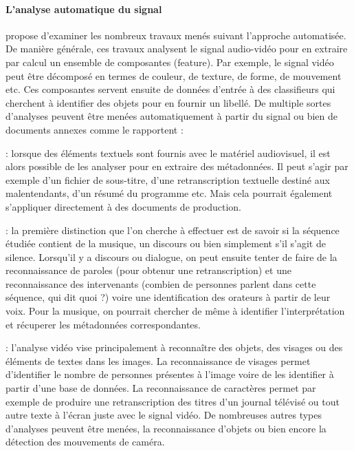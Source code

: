 \paragraph{L'analyse automatique du signal}
\cite{Staab2008} propose d'examiner les nombreux travaux menés suivant l'approche automatisée. 
De manière générale, ces travaux analysent le signal audio-vidéo pour en extraire par calcul un ensemble de composantes (feature).
Par exemple, le signal vidéo peut être décomposé en termes de couleur, de texture, de forme, de mouvement etc. 
Ces composantes servent ensuite de données d'entrée à des classifieurs qui cherchent à identifier des objets pour en fournir un libellé. 
De multiple sortes d'analyses peuvent être menées automatiquement à partir du signal ou bien de documents annexes comme le rapportent \cite[\S 8 : Cataloguing and indexing]{Austerberry2004} : 
\begin{liste}
	\item {} : lorsque des éléments textuels sont fournis avec le matériel audiovisuel, il est alors possible de les analyser pour en extraire des métadonnées. 
	Il peut s'agir par exemple d'un fichier de sous-titre, d'une retranscription textuelle destiné aux malentendants, d'un résumé du programme etc. 
	Mais cela pourrait également s'appliquer directement à des documents de production.

	\item {} : la première distinction que l'on cherche à effectuer est de savoir si la séquence étudiée contient de la musique, un discours ou bien simplement s'il s'agit de silence.
	Lorsqu'il y a discours ou dialogue, on peut ensuite tenter de faire de la reconnaissance de paroles (pour obtenur une retranscription) et une reconnaissance des intervenants (combien de personnes parlent dans cette séquence, qui dit quoi ?) voire une identification des orateurs à partir de leur voix. 
	Pour la musique, on pourrait chercher de même à identifier l'interprétation et récuperer les métadonnées correspondantes. 

	\item {} : l'analyse vidéo vise principalement à reconnaître des objets, des visages ou des éléments de textes dans les images. 
	La reconnaissance de visages permet d'identifier le nombre de personnes présentes à l'image voire de les identifier à partir d'une base de données. 
	La reconnaissance de caractères permet par exemple de produire une retranscription des titres d'un journal télévisé ou tout autre texte à l'écran juste avec le signal vidéo. 
	De nombreuses autres types d'analyses peuvent être menées, la reconnaissance d'objets ou bien encore la détection des mouvements de caméra. 
\end{liste}


